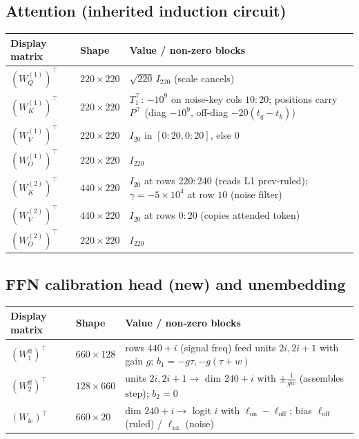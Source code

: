 \documentclass[11pt]{article}
\newcommand{\T}{^{\!\top}}
\begin{document}
\subsection{Attention (inherited induction circuit)}
\begin{center}\small
\begin{tabular}{@{}ll p{9.2cm}@{}}
\toprule
Display matrix & Shape & Value / non-zero blocks\\
\midrule
$(W^{(1)}_Q)\T$ & $220\times220$ & $\sqrt{220}\,I_{220}$ (scale cancels)\\
$(W^{(1)}_K)\T$ & $220\times220$ & $T_1\T$: $-10^9$ on noise-key cols $10{:}20$; positions carry $P\T$ (diag $-10^9$, off-diag $-20(t_q{-}t_k)$)\\
$(W^{(1)}_V)\T$ & $220\times220$ & $I_{20}$ in $[0{:}20,0{:}20]$, else $0$\\
$(W^{(1)}_O)\T$ & $220\times220$ & $I_{220}$\\
$(W^{(2)}_K)\T$ & $440\times220$ & $I_{20}$ at rows $220{:}240$ (reads L1 prev-ruled); $\gamma=-5\!\times\!10^4$ at row $10$ (noise filter)\\
$(W^{(2)}_V)\T$ & $440\times220$ & $I_{20}$ at rows $0{:}20$ (copies attended token)\\
$(W^{(2)}_O)\T$ & $220\times220$ & $I_{220}$\\
\bottomrule
\end{tabular}
\end{center}

\subsection{FFN calibration head (new) and unembedding}
\begin{center}\small
\begin{tabular}{@{}ll p{9.2cm}@{}}
\toprule
Display matrix & Shape & Value / non-zero blocks\\
\midrule
$(W_1^{\mathrm{ff}})\T$ & $660\times128$ & rows $440{+}i$ (signal freq) feed units $2i,2i{+}1$ with gain $g$; $b_1=-g\tau,-g(\tau{+}w)$\\
$(W_2^{\mathrm{ff}})\T$ & $128\times660$ & units $2i,2i{+}1\to$ dim $240{+}i$ with $\pm\tfrac{1}{gw}$ (assembles $\mathrm{step}$); $b_2=0$\\
$(W_{\mathrm{fc}})\T$ & $660\times20$ & dim $240{+}i\to$ logit $i$ with $\ell_{\mathrm{on}}{-}\ell_{\mathrm{off}}$; bias $\ell_{\mathrm{off}}$ (ruled) / $\ell_{\mathrm{nz}}$ (noise)\\
\bottomrule
\end{tabular}
\end{center}
\end{document}

